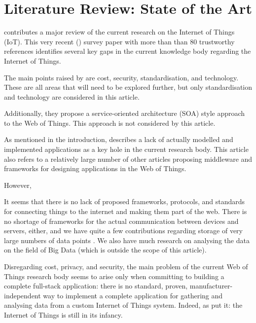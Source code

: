\section{Literature Review: State of the Art}

\textcite{xu-he-li:internet-of-things-in-industries-a-survey:2014} contributes a major review of the current research on the Internet of Things (IoT). This very recent (\citeyear{xu-he-li:internet-of-things-in-industries-a-survey:2014}) survey paper with more than than 80 trustworthy references identifies several key gaps in the current knowledge body regarding the Internet of Things.

The main points raised by \citeauthor{xu-he-li:internet-of-things-in-industries-a-survey:2014} are cost, security, standardisation, and technology. These are all areas that will need to be explored further, but only standardisation and technology are considered in this article.

Additionally, they propose a service-oriented architecture (SOA) style approach to the Web of Things. This approach is not considered by this article.

As mentioned in the introduction, \textcite{paganelli-turchi-guili:a-web-of-things-framework-for-restful-applications-and-its-experimentation-in-a-smart-city:2014} describes a lack of actually modelled and implemented applications as a key hole in the current research body. This article also refers to a relatively large number of other articles proposing middleware and frameworks for designing applications in the Web of Things.

However, \textcite{palattella-accettura-vilajosana-watteyne-gieco-boggia-dohler:standardized-protocol-stack-for-the-internet-of-important-things:2012} 

It seems that there is no lack of proposed frameworks, protocols, and standards for connecting things to the internet and making them part of the web. There is no shortage of frameworks for the actual communication between devices and servers, either, and we have quite a few contributions regarding storage of very large numbers of data points . We also have much research on analysing the data on the field of Big Data (which is outside the scope of this article).

Disregarding cost, privacy, and security, the main problem of the current Web of Things research body seems to arise only when committing to building a complete full-stack application: there is no standard, proven, manufacturer-independent way to implement a complete application for gathering and analysing data from a custom Internet of Things system. Indeed, as \textcite{xu-he-li:internet-of-things-in-industries-a-survey:2014} put it: the Internet of Things is still in its infancy.
